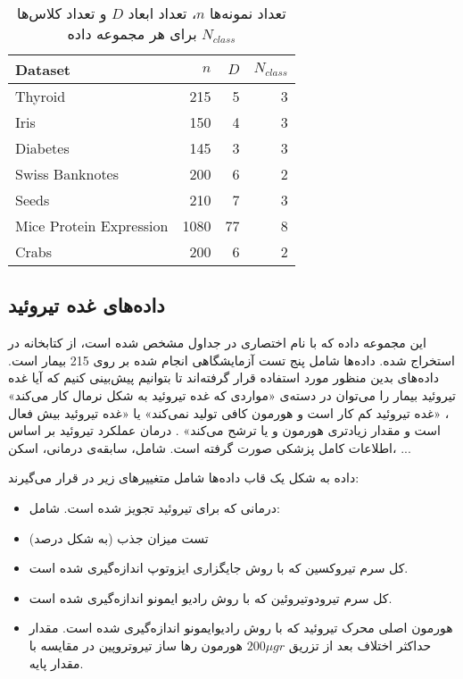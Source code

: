 \begin{table}[H]
\centering{}
\caption{
تعداد نمونه‌ها $n$، تعداد ابعاد $D$ و تعداد کلاس‌ها 
$N_{class}$
برای هر مجموعه داده
}
\begin{latin}
\bigskip
\begin{tabular}{|l|r|r|r|}
\hline
Dataset & $n$ & $D$ & $N_{class}$\\
\hline
Thyroid & 215 & 5 & 3\\
\hline
Iris & 150 & 4 & 3\\
\hline
Diabetes & 145 & 3 & 3\\
\hline
Swiss Banknotes & 200 & 6 & 2\\
\hline
Seeds & 210 & 7 & 3\\
\hline
Mice Protein Expression & 1080 & 77 & 8\\
\hline
Crabs & 200 & 6 & 2\\
\hline
\end{tabular}
\end{latin}
\end{table}




\subsection{
داده‌های غده تیروئید
}
\label{sec:Thyroid}
این مجموعه داده که با نام اختصاری 
در جداول مشخص شده است، از کتابخانه
\cite{rmclust}
در 
استخراج شده. داده‌ها شامل پنج تست آزمایشگاهی انجام شده بر روی 215 بیمار است. داده‌های بدین منظور مورد استفاده قرار گرفته‌اند تا بتوانیم پیش‌بینی کنیم که آیا غده تیروئید بیمار را می‌توان در دسته‌ی «مواردی که غده تیروئید به شکل نرمال کار می‌کند»
، «غده تیروئید کم کار است و هورمون کافی تولید نمی‌کند»
یا «غده تیروئید بیش فعال است و مقدار زیادتری هورمون 
و یا
ترشح می‌کند»
. درمان عملکرد تیروئید بر اساس اطلاعات کامل پزشکی صورت گرفته است. شامل، سابقه‌ی درمانی، اسکن، ...

داده به شکل یک قاب دا‌ده‌ها
شامل متغییر‌های زیر در 
قرار می‌گیرند:
\begin{itemize}
\item
{}
درمانی که برای تیروئید تجویز شده است. شامل:
\item
{}
تست میزان جذب 
(به شکل درصد)
\item
{}
کل سرم تیروکسین که با روش جایگزاری ایزوتوپ
اندازه‌گیری شده است.
\item
{}
کل سرم تیرودوتیروئین 
که با روش رادیو ایمونو
اندازه‌گیری شده است.
\item
{}
هورمون اصلی محرک تیروئید که با روش رادیوایمونو اندازه‌گیری شده است.
مقدار حداکثر اختلاف
بعد از تزریق
$200 \mu gr$
هورمون رها ساز تیروتروپین
در مقایسه با مقدار پایه.
\end{itemize}


